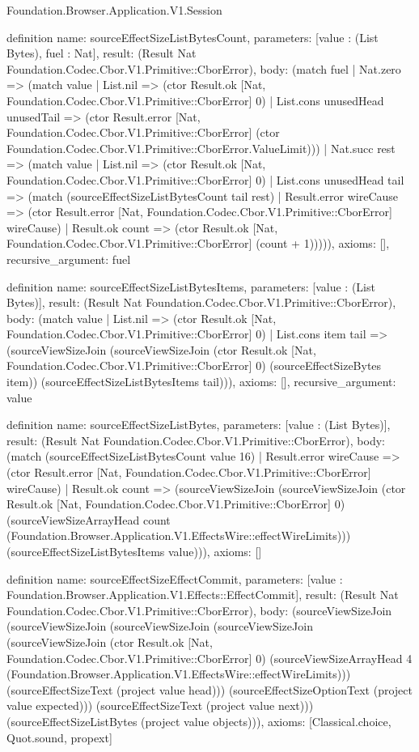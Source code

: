 \begin{lexlean}{Foundation.Browser.Application.V1.Session}
\begin{semanticmodule}
definition{
  name: sourceEffectSizeListBytesCount,
  parameters: [value : (List Bytes), fuel : Nat],
  result: (Result Nat Foundation.Codec.Cbor.V1.Primitive::CborError),
  body: (match fuel
    | Nat.zero => (match value
      | List.nil => (ctor Result.ok [Nat, Foundation.Codec.Cbor.V1.Primitive::CborError] 0)
      | List.cons unusedHead unusedTail => (ctor Result.error [Nat, Foundation.Codec.Cbor.V1.Primitive::CborError] (ctor Foundation.Codec.Cbor.V1.Primitive::CborError.ValueLimit)))
    | Nat.succ rest => (match value
      | List.nil => (ctor Result.ok [Nat, Foundation.Codec.Cbor.V1.Primitive::CborError] 0)
      | List.cons unusedHead tail => (match (sourceEffectSizeListBytesCount tail rest)
        | Result.error wireCause => (ctor Result.error [Nat, Foundation.Codec.Cbor.V1.Primitive::CborError] wireCause)
        | Result.ok count => (ctor Result.ok [Nat, Foundation.Codec.Cbor.V1.Primitive::CborError] (count + 1))))),
  axioms: [],
  recursive_argument: fuel
}

definition{
  name: sourceEffectSizeListBytesItems,
  parameters: [value : (List Bytes)],
  result: (Result Nat Foundation.Codec.Cbor.V1.Primitive::CborError),
  body: (match value
    | List.nil => (ctor Result.ok [Nat, Foundation.Codec.Cbor.V1.Primitive::CborError] 0)
    | List.cons item tail => (sourceViewSizeJoin (sourceViewSizeJoin (ctor Result.ok [Nat, Foundation.Codec.Cbor.V1.Primitive::CborError] 0) (sourceEffectSizeBytes item)) (sourceEffectSizeListBytesItems tail))),
  axioms: [],
  recursive_argument: value
}

definition{
  name: sourceEffectSizeListBytes,
  parameters: [value : (List Bytes)],
  result: (Result Nat Foundation.Codec.Cbor.V1.Primitive::CborError),
  body: (match (sourceEffectSizeListBytesCount value 16)
    | Result.error wireCause => (ctor Result.error [Nat, Foundation.Codec.Cbor.V1.Primitive::CborError] wireCause)
    | Result.ok count => (sourceViewSizeJoin (sourceViewSizeJoin (ctor Result.ok [Nat, Foundation.Codec.Cbor.V1.Primitive::CborError] 0) (sourceViewSizeArrayHead count (Foundation.Browser.Application.V1.EffectsWire::effectWireLimits))) (sourceEffectSizeListBytesItems value))),
  axioms: []
}

definition{
  name: sourceEffectSizeEffectCommit,
  parameters: [value : Foundation.Browser.Application.V1.Effects::EffectCommit],
  result: (Result Nat Foundation.Codec.Cbor.V1.Primitive::CborError),
  body: (sourceViewSizeJoin (sourceViewSizeJoin (sourceViewSizeJoin (sourceViewSizeJoin (sourceViewSizeJoin (ctor Result.ok [Nat, Foundation.Codec.Cbor.V1.Primitive::CborError] 0) (sourceViewSizeArrayHead 4 (Foundation.Browser.Application.V1.EffectsWire::effectWireLimits))) (sourceEffectSizeText (project value head))) (sourceEffectSizeOptionText (project value expected))) (sourceEffectSizeText (project value next))) (sourceEffectSizeListBytes (project value objects))),
  axioms: [Classical.choice, Quot.sound, propext]
}


\end{semanticmodule}
\end{lexlean}
